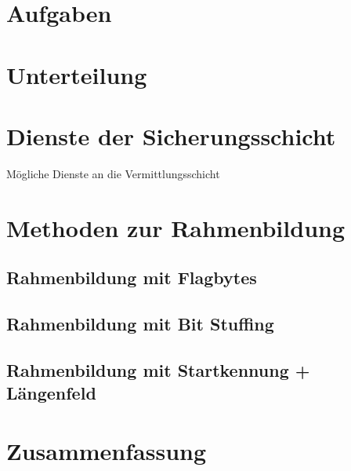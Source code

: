\section{Aufgaben}

\section{Unterteilung}

\section{Dienste der Sicherungsschicht}
Mögliche Dienste an die Vermittlungsschicht

\section{Methoden zur Rahmenbildung}
\subsection{Rahmenbildung mit Flagbytes}
\subsection{Rahmenbildung mit Bit Stuffing}
\subsection{Rahmenbildung mit Startkennung + Längenfeld}

\section{Zusammenfassung}
